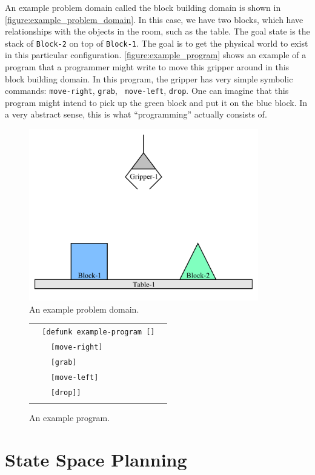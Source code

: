 An example problem domain called the block building domain is shown in
{\mbox{\autoref{figure:example_problem_domain}}}.  In this case, we
have two blocks, which have relationships with the objects in the
room, such as the table.  The goal state is the stack of {\tt Block-2}
on top of {\tt Block-1}.  The goal is to get the physical world to
exist in this particular configuration.
{\mbox{\autoref{figure:example_program}}} shows an example of a
program that a programmer might write to move this gripper around in
this block building domain.  In this program, the gripper has very
simple symbolic commands: {\tt move-right}, {\tt grab}, {\tt
  move-left}, {\tt drop}.  One can imagine that this program might
intend to pick up the green block and put it on the blue block.  In a
very abstract sense, this is what ``programming'' actually consists
of.
\begin{figure}
\center
\includegraphics[width=10cm]{gfx/blocks_world_example-1}
\caption{An example problem domain.}
\label{figure:example_problem_domain}
\end{figure}
\begin{figure}
\center
\begin{tabular}{l}
\\
  {\tt ~~[defunk example-program []}~~ \\
  {\tt ~~~~[move-right]} ~~\\
  {\tt ~~~~[grab]} ~~\\
  {\tt ~~~~[move-left]} ~~\\
  {\tt ~~~~[drop]]} ~~\\
\\
\end{tabular}
\caption{An example program.}
\label{figure:example_program}
\end{figure}

\section{State Space Planning}

